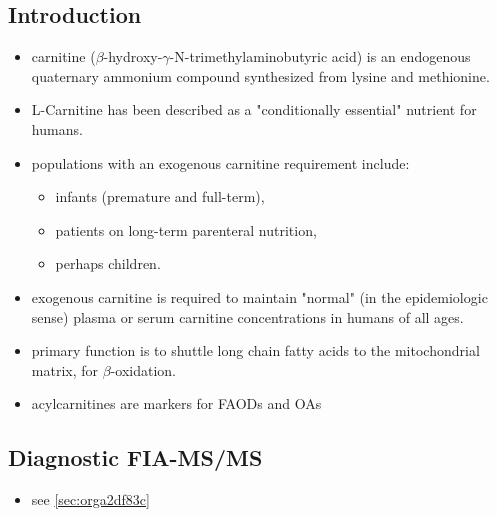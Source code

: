 \documentclass{scrartcl}
\begin{document}
\subsection{Introduction}
\label{sec:org4878b2f}
\begin{itemize}
\item carnitine (\(\beta\)-hydroxy-\(\gamma\)-N-trimethylaminobutyric acid) is
an endogenous quaternary ammonium compound synthesized from lysine
and methionine.
\item L-Carnitine has been described as a "conditionally essential"
nutrient for humans.
\item populations with an exogenous carnitine requirement include:
\begin{itemize}
\item infants (premature and full-term),
\item patients on long-term parenteral nutrition,
\item perhaps children.
\end{itemize}
\item exogenous carnitine is required to maintain "normal" (in the
epidemiologic sense) plasma or serum carnitine concentrations in
humans of all ages.
\item primary function is to shuttle long chain fatty acids to the
mitochondrial matrix, for \(\beta\)-oxidation.
\item acylcarnitines are markers for FAODs and OAs
\end{itemize}

\vspace{2em}

\hspace{3em}

\subsection{Diagnostic FIA-MS/MS}
\label{sec:org4f0c1bb}
\begin{itemize}
\item see \ref{sec:orga2df83c}
\end{itemize}
\end{document}
